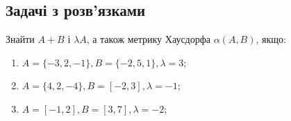 \subsection{Задачі з розв'язками}

\begin{problem}
	Знайти $A + B$ і $\lambda A$, а також метрику Хаусдорфа $\alpha (A, B)$, якщо:
	
	\begin{enumerate}
	    \item $A = \{-3, 2, -1\},  B = \{-2, 5, 1\},  \lambda = 3$;
	    
	    \item $A = \{4, 2, -4\},  B = [-2, 3],  \lambda = -1$;
	    
	    \item $A = [-1, 2],  B = [3, 7],  \lambda = -2$;	    
	\end{enumerate}
	
\end{problem}

